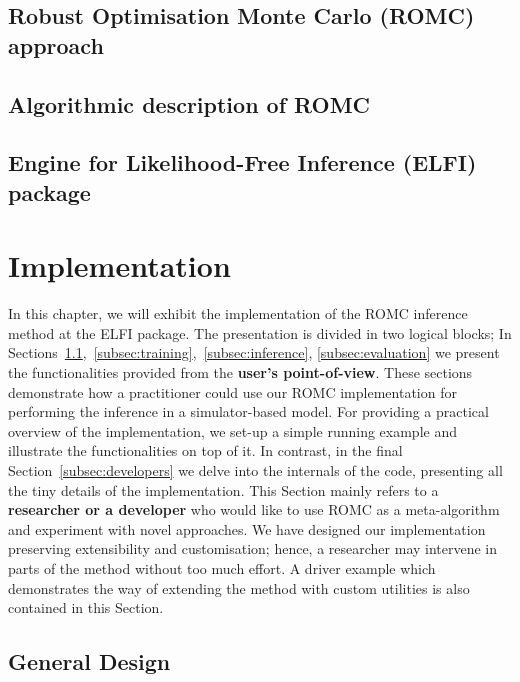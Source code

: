 \documentclass[11pt,twoside]{article}
\numberwithin{Theorem}{section}
\numberwithin{Definition}{section}
\numberwithin{Lemma}{section}
\numberwithin{Algorithm}{section}
\numberwithin{equation}{section}
\begin{document}
\subsection{Robust Optimisation Monte Carlo (ROMC) approach}
\label{subsec:ROMC}
% 


\subsection{Algorithmic description of ROMC}
\label{subsec:romc-algorithmic}
% 


\subsection{Engine for Likelihood-Free Inference (ELFI) package}
\label{subsec:elfi}
% 


\clearpage
\section{Implementation}
In this chapter, we will exhibit the implementation of the ROMC
inference method at the ELFI package. The presentation is divided in
two logical blocks; In
Sections~\ref{subsec:general_design},~\ref{subsec:training},~\ref{subsec:inference},
\ref{subsec:evaluation} we present the functionalities provided from
the \textbf{user's point-of-view}. These sections demonstrate how a
practitioner could use our ROMC implementation for performing the
inference in a simulator-based model. For providing a practical
overview of the implementation, we set-up a simple running example and
illustrate the functionalities on top of it. In contrast, in the final
Section~\ref{subsec:developers} we delve into the internals of the
code, presenting all the tiny details of the implementation. This
Section mainly refers to a \textbf{researcher or a developer} who
would like to use ROMC as a meta-algorithm and experiment with novel
approaches. We have designed our implementation preserving
extensibility and customisation; hence, a researcher may intervene in
parts of the method without too much effort. A driver example which
demonstrates the way of extending the method with custom utilities is
also contained in this Section.

\subsection{General Design}
\label{subsec:general_design}
% 

\end{document}
